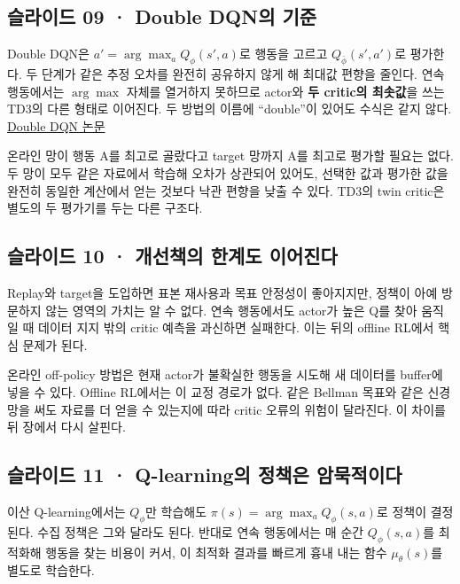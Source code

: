 \documentclass[11pt,a4paper]{article}
\begin{document}
\subsection{슬라이드 09 · Double DQN의 기준}

Double DQN은 $a'=\arg\max_aQ_\phi(s',a)$로 행동을 고르고 $Q_{\bar\phi}(s',a')$로 평가한다. 두 단계가 같은 추정 오차를 완전히 공유하지 않게 해 최대값 편향을 줄인다. 연속 행동에서는 $\arg\max$ 자체를 열거하지 못하므로 actor와 \textbf{두 critic의 최솟값}을 쓰는 TD3의 다른 형태로 이어진다. 두 방법의 이름에 “double”이 있어도 수식은 같지 않다. \href{https://arxiv.org/abs/1509.06461}{Double DQN 논문}\par

온라인 망이 행동 A를 최고로 골랐다고 target 망까지 A를 최고로 평가할 필요는 없다. 두 망이 모두 같은 자료에서 학습해 오차가 상관되어 있어도, 선택한 값과 평가한 값을 완전히 동일한 계산에서 얻는 것보다 낙관 편향을 낮출 수 있다. TD3의 twin critic은 별도의 두 평가기를 두는 다른 구조다.\par

\subsection{슬라이드 10 · 개선책의 한계도 이어진다}

Replay와 target을 도입하면 표본 재사용과 목표 안정성이 좋아지지만, 정책이 아예 방문하지 않는 영역의 가치는 알 수 없다. 연속 행동에서도 actor가 높은 Q를 찾아 움직일 때 데이터 지지 밖의 critic 예측을 과신하면 실패한다. 이는 뒤의 offline RL에서 핵심 문제가 된다.\par

온라인 off-policy 방법은 현재 actor가 불확실한 행동을 시도해 새 데이터를 buffer에 넣을 수 있다. Offline RL에서는 이 교정 경로가 없다. 같은 Bellman 목표와 같은 신경망을 써도 자료를 더 얻을 수 있는지에 따라 critic 오류의 위험이 달라진다. 이 차이를 뒤 장에서 다시 살핀다.\par

\subsection{슬라이드 11 · Q-learning의 정책은 암묵적이다}

이산 Q-learning에서는 $Q_\phi$만 학습해도 $\pi(s)=\arg\max_aQ_\phi(s,a)$로 정책이 결정된다. 수집 정책은 그와 달라도 된다. 반대로 연속 행동에서는 매 순간 $Q_\phi(s,a)$를 최적화해 행동을 찾는 비용이 커서, 이 최적화 결과를 빠르게 흉내 내는 함수 $\mu_\theta(s)$를 별도로 학습한다.\par
\end{document}
